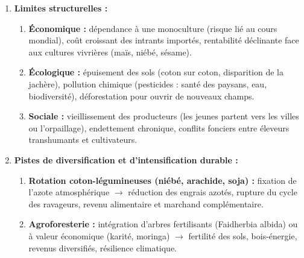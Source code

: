 \documentclass[11pt]{article}
\begin{document}
\begin{exoresolu}
\begin{enumerate}
    \textbf{3 services :} (1) crédit intrants sans garantie foncière (la récolte future sert de garantie) ; (2) encadrement technique de proximité ; (3) prix plancher garanti qui amortit les chutes du cours mondial.
    \item \textbf{Limites structurelles :}
    \begin{enumerate}
        \item \textbf{Économique :} dépendance à une monoculture (risque lié au cours mondial), coût croissant des intrants importés, rentabilité déclinante face aux cultures vivrières (maïs, niébé, sésame).
        \item \textbf{Écologique :} épuisement des sols (coton sur coton, disparition de la jachère), pollution chimique (pesticides : santé des paysans, eau, biodiversité), déforestation pour ouvrir de nouveaux champs.
        \item \textbf{Sociale :} vieillissement des producteurs (les jeunes partent vers les villes ou l'orpaillage), endettement chronique, conflits fonciers entre éleveurs transhumants et cultivateurs.
    \end{enumerate}
    \item \textbf{Pistes de diversification et d'intensification durable :}
    \begin{enumerate}
        \item \textbf{Rotation coton-légumineuses (niébé, arachide, soja) :} fixation de l'azote atmosphérique $\rightarrow$ réduction des engrais azotés, rupture du cycle des ravageurs, revenu alimentaire et marchand complémentaire.
        \item \textbf{Agroforesterie :} intégration d'arbres fertilisants (Faidherbia albida) ou à valeur économique (karité, moringa) $\rightarrow$ fertilité des sols, bois-énergie, revenus diversifiés, résilience climatique.
    \end{enumerate}
\end{enumerate}
\end{exoresolu}
\end{document}

